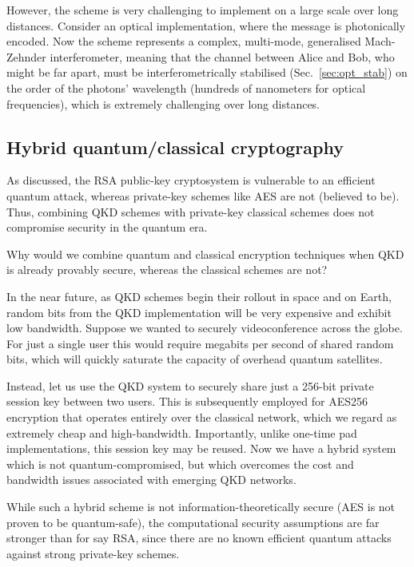However, the scheme is very challenging to implement on a large scale over long distances. Consider an optical implementation, where the message is photonically encoded. Now the scheme represents a complex, multi-mode, generalised Mach-Zehnder interferometer, meaning that the channel between Alice and Bob, who might be far apart, must be interferometrically stabilised (Sec.~\ref{sec:opt_stab}) on the order of the photons' wavelength (hundreds of nanometers for optical frequencies), which is extremely challenging over long distances.

%
%

\subsection{Hybrid quantum/classical cryptography}

As discussed, the RSA public-key cryptosystem is vulnerable to an efficient quantum attack, whereas private-key schemes like AES are not (believed to be). Thus, combining QKD schemes with private-key classical schemes does not compromise security in the quantum era.

Why would we combine quantum and classical encryption techniques when QKD is already provably secure, whereas the classical schemes are not?

In the near future, as QKD schemes begin their rollout in space and on Earth, random bits from the QKD implementation will be very expensive and exhibit low bandwidth. Suppose we wanted to securely videoconference across the globe. For just a single user this would require megabits per second of shared random bits, which will quickly saturate the capacity of overhead quantum satellites.

Instead, let us use the QKD system to securely share just a 256-bit private session key between two users. This is subsequently employed for AES256 encryption that operates entirely over the classical network, which we regard as extremely cheap and high-bandwidth. Importantly, unlike one-time pad implementations, this session key may be reused. Now we have a hybrid system which is not quantum-compromised, but which overcomes the cost and bandwidth issues associated with emerging QKD networks.

While such a hybrid scheme is not information-theoretically secure (AES is not proven to be quantum-safe), the computational security assumptions are far stronger than for say RSA, since there are no known efficient quantum attacks against strong private-key schemes.

